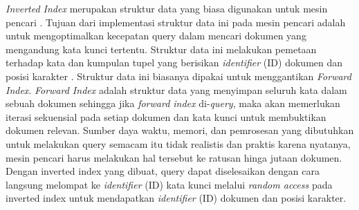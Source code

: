 \textit{Inverted Index} merupakan struktur data yang biasa digunakan untuk mesin pencari \parencite{invertedindex2}. Tujuan dari implementasi struktur data ini pada mesin pencari adalah untuk mengoptimalkan kecepatan query dalam mencari dokumen yang mengandung kata kunci tertentu. Struktur data ini melakukan pemetaan terhadap kata dan kumpulan tupel yang berisikan \textit{identifier} (ID) dokumen dan posisi karakter \parencite{invertedindex}. Struktur data ini biasanya dipakai untuk menggantikan \textit{Forward Index}. \textit{Forward Index} adalah struktur data yang menyimpan seluruh kata dalam sebuah dokumen sehingga jika \textit{forward index} di-\textit{query}, maka akan memerlukan iterasi sekuensial pada setiap dokumen dan kata kunci untuk membuktikan dokumen relevan. Sumber daya waktu, memori, dan pemrosesan yang dibutuhkan untuk melakukan query semacam itu tidak realistis dan praktis karena nyatanya, mesin pencari harus melakukan hal tersebut ke ratusan hinga jutaan dokumen. Dengan inverted index yang dibuat, query dapat diselesaikan dengan cara langsung melompat ke \textit{identifier} (ID) kata kunci melalui \textit{random access} pada inverted index untuk mendapatkan \textit{identifier} (ID) dokumen dan posisi karakter.